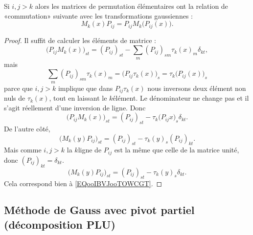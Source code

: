 \begin{lemma}        \label{LEMooYIYIooYhnaOt}
    Si \( i,j>k\) alors les matrices de permutation élémentaires ont la relation de «commutation» suivante avec les transformations gaussiennes :
    \begin{equation}
        M_k(x)P_{ij}=P_{ij}M_k\big(  P_{ij}(x) \big).
    \end{equation}
\end{lemma}

\begin{proof}
    Il suffit de calculer les éléments de matrice :
    \begin{equation}
        \big( P_{ij}M_k(x) \big)_{st}=(P_{ij})_{st}-\sum_m(P_{ij})_{sm}\tau_k(x)_{m}\delta_{kt},
    \end{equation}
    mais 
    \begin{equation}
        \sum_m(P_{ij})_{sm}\tau_k(x)_{m}=\big( P_{ij}\tau_k(x) \big)_s=\tau_k\big( P_{ij}(x) \big)_s
    \end{equation}
    parce que \( i,j>k\) implique que dans \( P_{ij}\tau_k(x)\) nous inversons deux élément non nuls de \( \tau_k(x)\), tout en laissant le \( k\)\ieme élément. Le dénominateur ne change pas et il s'agit réellement d'une inversion de ligne. Donc
    \begin{equation}        \label{EQooIBVJooTOWCGT}
        \big( P_{ij}M_k(x) \big)_{st}=(P_{ij})_{st}-\tau_k\big( P_{ij}x \big)_s\delta_{kt}.
    \end{equation}
    De l'autre côté,
    \begin{equation}
        \big( M_k(y)P_{ij} \big)_{st}=(P_{ij})_{st}-\tau_k(y)_s(P_{ij})_{kt}.
    \end{equation}
    Mais comme \( i,j>k\) la \( k\)\ieme ligne de \( P_{ij}\) est la même que celle de la matrice unité, donc \( (P_{ij})_{kt}=\delta_{kt}\).
    \begin{equation}
        \big( M_k(y)P_{ij} \big)_{st}=(P_{ij})_{st}-\tau_k(y)_s\delta_{kt}.
    \end{equation}
    Cela correspond bien à \eqref{EQooIBVJooTOWCGT}.
\end{proof}

\subsection{Méthode de Gauss avec pivot partiel (décomposition PLU)}

